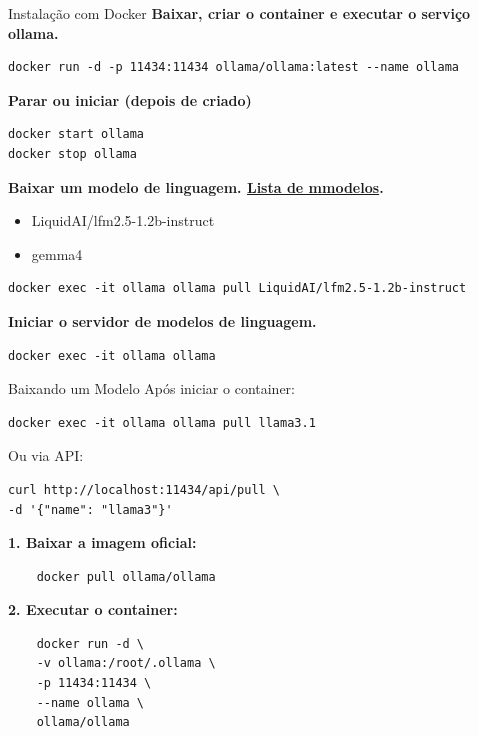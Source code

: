 \documentclass{beamer}
\begin{document}
\begin{frame}[fragile]{Instalação com Docker}
\textbf{Baixar, criar o container e executar o serviço ollama.}
\begin{verbatim}
docker run -d -p 11434:11434 ollama/ollama:latest --name ollama
\end{verbatim}
\textbf{Parar ou iniciar (depois de criado)}
\begin{verbatim}
docker start ollama
docker stop ollama
\end{verbatim}

\textbf{Baixar um modelo de linguagem. \href{https://ollama.com/search}{Lista de mmodelos}.}
\begin{itemize}
\item LiquidAI/lfm2.5-1.2b-instruct
\item gemma4
\end{itemize}
\begin{verbatim}
docker exec -it ollama ollama pull LiquidAI/lfm2.5-1.2b-instruct
\end{verbatim}

\textbf{Iniciar o servidor de modelos de linguagem.}
\begin{verbatim}
docker exec -it ollama ollama
\end{verbatim}

\end{frame}

\begin{frame}[fragile]{Baixando um Modelo}
Após iniciar o container:

\begin{verbatim}
docker exec -it ollama ollama pull llama3.1
\end{verbatim}

Ou via API:
\begin{verbatim}
curl http://localhost:11434/api/pull \
-d '{"name": "llama3"}'
\end{verbatim}
\textbf{1. Baixar a imagem oficial:}
\begin{verbatim}
    docker pull ollama/ollama
\end{verbatim}

\textbf{2. Executar o container:}
\begin{verbatim}
    docker run -d \
    -v ollama:/root/.ollama \
    -p 11434:11434 \
    --name ollama \
    ollama/ollama
\end{verbatim}

\end{frame}
\end{document}
